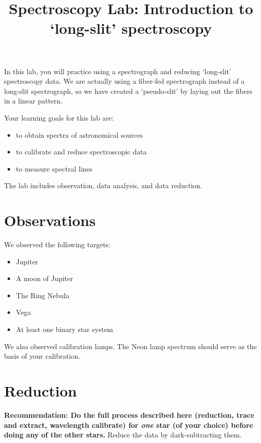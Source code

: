 \documentclass[11pt]{article}
\begin{document}
\title{Spectroscopy Lab: Introduction to `long-slit' spectroscopy}
In this lab, you will practice using a spectrograph and reducing `long-slit'
spectroscopy data.
We are actually using a fiber-fed spectrograph instead of a long-slit spectrograph,
so we have created a `pseudo-slit' by laying out the fibers in a linear pattern.

Your learning goals for this lab are:

\begin{itemize}
    \item to obtain spectra of astronomical sources
    \item to calibrate and reduce spectroscopic data
    \item to measure spectral lines
\end{itemize}

The lab includes observation, data analysis, and data reduction.




\section{Observations}

We observed the following targets:

\begin{itemize}
    \item Jupiter
    \item A moon of Jupiter
    \item The Ring Nebula
    \item Vega
    \item At least one binary star system
\end{itemize}

We also observed calibration lamps.  The Neon lamp spectrum should serve as the basis of your calibration.

\section{Reduction}
\textbf{Recommendation: Do the full process described here (reduction, trace
and extract, wavelength calibrate) for \emph{one} star (of your choice) before
doing any of the other stars.}
Reduce the data by dark-subtracting them.
\end{document}

